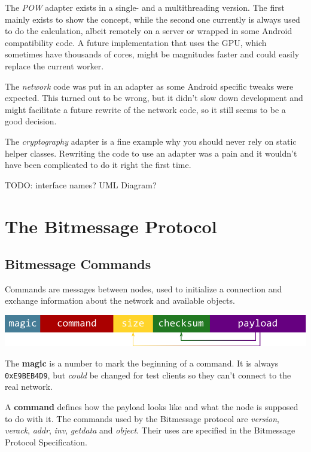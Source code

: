 \documentclass{bfh}
\begin{document}
  The \textit{\acl{POW}} adapter exists in a single- and a multithreading version. The first mainly exists to show the concept, while the second one currently is always used to do the calculation, albeit remotely on a server or wrapped in some Android compatibility code. A future implementation that uses the \acs{GPU}, which sometimes have thousands of cores, might be magnitudes faster and could easily replace the current worker.

  The \textit{network} code was put in an adapter as some Android specific tweaks were expected. This turned out to be wrong, but it didn't slow down development and might facilitate a future rewrite of the network code, so it still seems to be a good decision.

  The \textit{cryptography} adapter is a fine example why you should never rely on static helper classes. Rewriting the code to use an adapter was a pain and it wouldn't have been complicated to do it right the first time.

TODO: interface names? UML Diagram?

  \newpage
  \section{The Bitmessage Protocol}

  \subsection{Bitmessage Commands}

  Commands are messages between nodes, used to initialize a connection and exchange information about the network and available objects.

  \includegraphics[width=\textwidth]{images/command.pdf}

  The \textbf{magic} is a number to mark the beginning of a command. It is always \texttt{0xE9BEB4D9}, but \textit{could} be changed for test clients so they can't connect to the real network.

  A \textbf{command} defines how the payload looks like and what the node is supposed to do with it. The commands used by the Bitmessage protocol are \textit{version}, \textit{verack}, \textit{addr}, \textit{inv}, \textit{getdata} and \textit{object}. Their uses are specified in the Bitmessage Protocol Specification.\cite{wiki:protocol}
\end{document}
